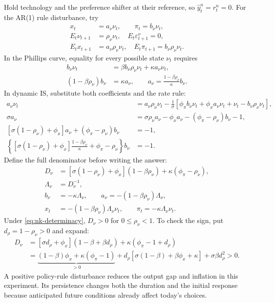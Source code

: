 Hold technology and the preference shifter at their reference, so
$\hat y_t^n=r_t^n=0$. For the AR(1) rule disturbance, try
\begin{align}
 x_t&=a_\nu\nu_t,\qquad \pi_t=b_\nu\nu_t,\\
 E_t\nu_{t+1}&=\rho_\nu\nu_t,
 \quad E_t\varepsilon_{t+1}^\nu=0,\\
 E_tx_{t+1}&=a_\nu\rho_\nu\nu_t,
 \quad E_t\pi_{t+1}=b_\nu\rho_\nu\nu_t.
\end{align}
In the Phillips curve, equality for every possible state $\nu_t$ requires
\begin{align}
 b_\nu\nu_t&=\beta b_\nu\rho_\nu\nu_t+\kappa a_\nu\nu_t,\\
 (1-\beta\rho_\nu)b_\nu&=\kappa a_\nu,\qquad
 a_\nu=\frac{1-\beta\rho_\nu}{\kappa}b_\nu.
\end{align}
In dynamic IS, substitute both coefficients and the rate rule:
\begin{align}
 a_\nu\nu_t&=a_\nu\rho_\nu\nu_t
 -\frac1\sigma[\phi_\pi b_\nu\nu_t+\phi_xa_\nu\nu_t
                           +\nu_t-b_\nu\rho_\nu\nu_t],\\
 \sigma a_\nu&=\sigma\rho_\nu a_\nu-\phi_xa_\nu
                                     -(\phi_\pi-\rho_\nu)b_\nu-1,\\
 [\sigma(1-\rho_\nu)+\phi_x]a_\nu
                       +(\phi_\pi-\rho_\nu)b_\nu&=-1,\\
 \left\{[\sigma(1-\rho_\nu)+\phi_x]
       \frac{1-\beta\rho_\nu}{\kappa}+\phi_\pi-\rho_\nu\right\}b_\nu&=-1.
\end{align}
Define the full denominator before writing the answer:
\begin{align}
 D_\nu&=[\sigma(1-\rho_\nu)+\phi_x](1-\beta\rho_\nu)
                                     +\kappa(\phi_\pi-\rho_\nu),\\
 \Lambda_\nu&=D_\nu^{-1},\\
 b_\nu&=-\kappa\Lambda_\nu,\qquad
 a_\nu=-(1-\beta\rho_\nu)\Lambda_\nu,\\
 x_t&=-(1-\beta\rho_\nu)\Lambda_\nu\nu_t,\qquad
 \pi_t=-\kappa\Lambda_\nu\nu_t.\label{eq:nk-shock-solution}
\end{align}
Under \eqref{eq:nk-determinacy}, $D_\nu>0$ for $0\leq\rho_\nu<1$.
To check the sign, put $d_\rho=1-\rho_\nu>0$ and expand:
\begin{align}
 D_\nu&=[\sigma d_\rho+\phi_x](1-\beta+\beta d_\rho)
                             +\kappa(\phi_\pi-1+d_\rho)\\
 &=\underbrace{(1-\beta)\phi_x+\kappa(\phi_\pi-1)}_{>0}
   +d_\rho[\sigma(1-\beta)+\beta\phi_x+\kappa]
   +\sigma\beta d_\rho^2>0.
\end{align}
A positive policy-rule disturbance reduces the output gap and inflation in
this experiment. Its persistence changes both the duration and the initial
response because anticipated future conditions already affect today's choices.

